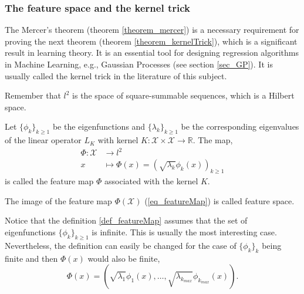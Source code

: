 
\subsubsection{The feature space and the kernel trick} \label{sec_featureSpaceKernelTrick}

The Mercer's theorem (theorem \ref{theorem_mercer}) is a necessary requirement for proving the next theorem (theorem \ref{theorem_kernelTrick}), which is a significant result in learning theory. It is an essential tool for designing regression algorithms in Machine Learning, e.g., Gaussian Processes (see section \ref{sec_GP}). It is usually called the kernel trick in the literature of this subject.

Remember that $l^2$ is the space of square-summable sequences, which is a Hilbert space. 

\begin{definition} \label{def_featureMap}
  Let $\{\phi_k\}_{k \geq 1}$ be the eigenfunctions and $\{\lambda_k\}_{k \geq 1}$ be the corresponding eigenvalues of the linear operator $L_K$ with kernel $K: \mathcal{X} \times \mathcal{X} \to \mathbb{R}$. The map,
  \begin{equation} \label{eq_featureMap}
    \begin{aligned}
      \Phi : \mathcal{X} &\to     l^2  \\
             x &\mapsto \Phi(x) = (\sqrt{\lambda_k}\phi_k(x))_{k \geq 1}
    \end{aligned}
  \end{equation}
  is called the feature map $\Phi$ associated with the kernel $K$.
\end{definition}

\begin{definition}
  The image of the feature map $\Phi(\mathcal{X})$ (\ref{eq_featureMap}) is called feature space.
\end{definition}

\begin{remark}
  Notice that the definition \ref{def_featureMap} assumes that the set of eigenfunctions $\{\phi_k\}_{k \geq 1}$ is infinite. This is usually the most interesting case. Nevertheless, the definition can easily be changed for the case of $\{\phi_k\}_{k}$ being finite and then $\Phi(x)$ would also be finite,
  \begin{equation*}
    \Phi(x) = \left(\sqrt{\lambda_1}\phi_1(x), \dots, \sqrt{\lambda_{k_{max}}}\phi_{k_{max}}(x)\right).
  \end{equation*}  
\end{remark}

